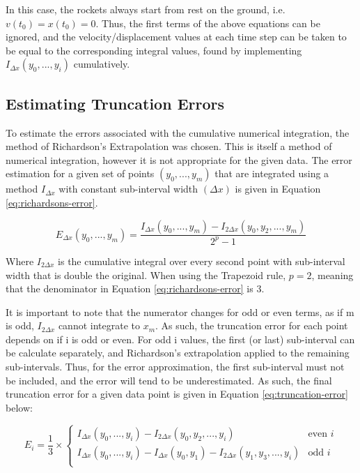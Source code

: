 \documentclass{article}
\begin{document}
        In this case, the rockets always start from rest on the ground, i.e. $v(t_0) = x(t_0) = 0$. Thus, the first terms of the above equations can be ignored, and the velocity/displacement values at each time step can be taken to be equal to the corresponding integral values, found by implementing $I_{\Delta x} (y_0, ..., y_i)$ cumulatively.

    \subsection*{Estimating Truncation Errors}

        To estimate the errors associated with the cumulative numerical integration, the method of Richardson's Extrapolation was chosen. This is itself a method of numerical integration, however it is not appropriate for the given data. The error estimation for a given set of points $(y_0, ..., y_m)$ that are integrated using a method $I_{\Delta x}$ with constant sub-interval width $(\Delta x)$ is given in Equation \ref{eq:richardsons-error}. 

        \begin{equation}
            E_{\Delta x} (y_0, ..., y_m) = \frac{I_{\Delta x}(y_0, ..., y_m) - I_{2 \Delta x}(y_0, y_2, ..., y_m)}{2^p -1}
            \label{eq:richardsons-error}
        \end{equation}

        Where $I_{2 \Delta x}$ is the cumulative integral over every second point with sub-interval width that is double the original. When using the Trapezoid rule, $p = 2$, meaning that the denominator in Equation \ref{eq:richardsons-error} is 3. 
        
        It is important to note that the numerator changes for odd or even terms, as if m is odd, $I_{2 \Delta x}$ cannot integrate to $x_m$. As such, the truncation error for each point depends on if i is odd or even. For odd i values, the first (or last) sub-interval can be calculate separately, and Richardson's extrapolation applied to the remaining sub-intervals. Thus, for the error approximation, the first sub-interval must not be included, and the error will tend to be underestimated. As such, the final truncation error for a given data point is given in Equation \ref{eq:truncation-error} below:

        \begin{equation}
            E_i = \frac{1}{3} \times \begin{cases}
                I_{\Delta x}(y_0, ..., y_i) - I_{2 \Delta x}(y_0, y_2, ..., y_i) & \text{even } i \\
                I_{\Delta x}(y_0, ..., y_i) - I_{\Delta x} (y_0, y_1) - I_{2 \Delta x}(y_1, y_3, ..., y_i) & \text{odd } i \\
                \end{cases}
            \label{eq:truncation-error}
        \end{equation}
\end{document}
